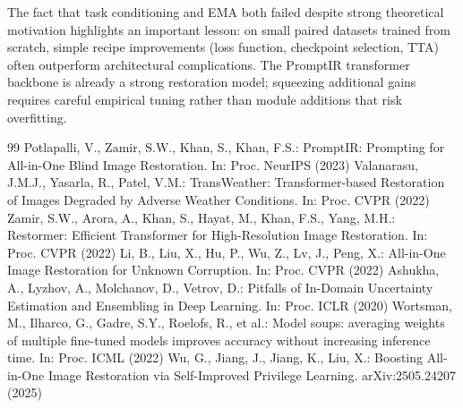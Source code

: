\documentclass[12pt, a4paper]{article}
\begin{document}
The fact that task conditioning and EMA both failed despite strong theoretical motivation highlights an important lesson: on small paired datasets trained from scratch, simple recipe improvements (loss function, checkpoint selection, TTA) often outperform architectural complications. The PromptIR transformer backbone is already a strong restoration model; squeezing additional gains requires careful empirical tuning rather than module additions that risk overfitting.

\newpage
\begin{thebibliography}{99}
 Potlapalli, V., Zamir, S.W., Khan, S., Khan, F.S.: PromptIR: Prompting for All-in-One Blind Image Restoration. In: Proc. NeurIPS (2023)
 Valanarasu, J.M.J., Yasarla, R., Patel, V.M.: TransWeather: Transformer-based Restoration of Images Degraded by Adverse Weather Conditions. In: Proc. CVPR (2022)
 Zamir, S.W., Arora, A., Khan, S., Hayat, M., Khan, F.S., Yang, M.H.: Restormer: Efficient Transformer for High-Resolution Image Restoration. In: Proc. CVPR (2022)
 Li, B., Liu, X., Hu, P., Wu, Z., Lv, J., Peng, X.: All-in-One Image Restoration for Unknown Corruption. In: Proc. CVPR (2022)
 Ashukha, A., Lyzhov, A., Molchanov, D., Vetrov, D.: Pitfalls of In-Domain Uncertainty Estimation and Ensembling in Deep Learning. In: Proc. ICLR (2020)
 Wortsman, M., Ilharco, G., Gadre, S.Y., Roelofs, R., et al.: Model soups: averaging weights of multiple fine-tuned models improves accuracy without increasing inference time. In: Proc. ICML (2022)
 Wu, G., Jiang, J., Jiang, K., Liu, X.: Boosting All-in-One Image Restoration via Self-Improved Privilege Learning. arXiv:2505.24207 (2025)
\end{thebibliography}
\end{document}

